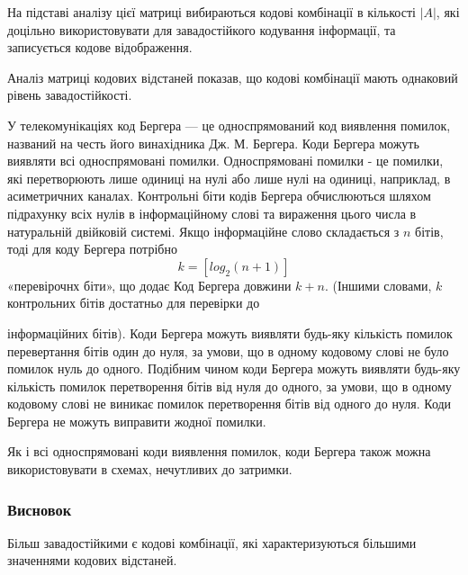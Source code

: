\documentclass[a4paper,14pt]{extreport}
\begin{document}
На підставі аналізу цієї матриці вибираються кодові комбінації в кількості $|A|$, які
доцільно використовувати для завадостійкого кодування
інформації, та записується кодове відображення.

Аналіз матриці кодових відстаней показав, що кодові комбінації мають однаковий рівень завадостійкості.

У телекомунікаціях код Бергера — це односпрямований код виявлення помилок, названий на честь його винахідника Дж. М. Бергера. Коди Бергера можуть виявляти всі односпрямовані помилки. Односпрямовані помилки - це помилки, які перетворюють лише одиниці на нулі або лише нулі на одиниці, наприклад, в асиметричних каналах. Контрольні біти кодів Бергера обчислюються шляхом підрахунку всіх нулів в інформаційному слові та вираження цього числа в натуральній двійковій системі. Якщо інформаційне слово складається з $n$ бітів, тоді для коду Бергера потрібно $$k = [ log_2 ( n + 1 )]$$ «перевірочнх біти», що додає Код Бергера довжини $k+n$. (Іншими словами,  $k$ контрольних бітів достатньо для перевірки до


інформаційних бітів). Коди Бергера можуть виявляти будь-яку кількість помилок перевертання бітів один до нуля, за умови, що в одному кодовому слові не було помилок нуль до одного. Подібним чином коди Бергера можуть виявляти будь-яку кількість помилок перетворення бітів від нуля до одного, за умови, що в одному кодовому слові не виникає помилок перетворення бітів від одного до нуля. Коди Бергера не можуть виправити жодної помилки.

Як і всі односпрямовані коди виявлення помилок, коди Бергера також можна використовувати в схемах, нечутливих до затримки.
\subsubsection{Висновок}
Більш завадостійкими є кодові комбінації, які характеризуються більшими
значеннями кодових відстаней.
\end{document}
